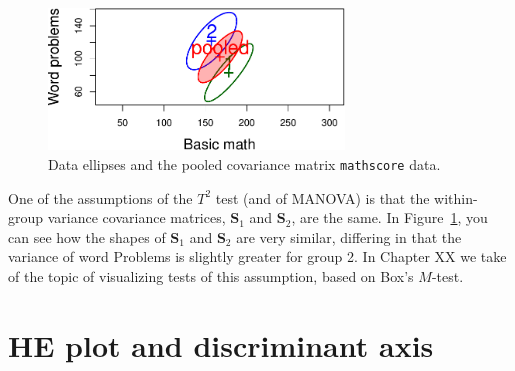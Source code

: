 \documentclass[
  letterpaper,
  10pt,
  krantz2]{krantz}
\makeatletter
\newenvironment{Shaded}{\begin{snugshade}}{\end{snugshade}}
\newcommand{\AttributeTok}[1]{\textcolor[rgb]{0.40,0.45,0.13}{#1}}
\newcommand{\ConstantTok}[1]{\textcolor[rgb]{0.56,0.35,0.01}{#1}}
\newcommand{\DecValTok}[1]{\textcolor[rgb]{0.68,0.00,0.00}{#1}}
\newcommand{\FloatTok}[1]{\textcolor[rgb]{0.68,0.00,0.00}{#1}}
\newcommand{\FunctionTok}[1]{\textcolor[rgb]{0.28,0.35,0.67}{#1}}
\newcommand{\NormalTok}[1]{\textcolor[rgb]{0.00,0.23,0.31}{#1}}
\newcommand{\SpecialCharTok}[1]{\textcolor[rgb]{0.37,0.37,0.37}{#1}}
\newcommand{\StringTok}[1]{\textcolor[rgb]{0.13,0.47,0.30}{#1}}
\newenvironment{kframe}{%
  \medskip{}
  \setlength{\fboxsep}{.8em}
  \def\at@end@of@kframe{}%
  \ifinner\ifhmode%
  \def\at@end@of@kframe{\end{minipage}}%
  \begin{minipage}{\columnwidth}%
  \fi\fi%
  \def\FrameCommand##1{\hskip\@totalleftmargin \hskip-\fboxsep
  \colorbox{shadecolor}{##1}\hskip-\fboxsep
      \hskip-\linewidth \hskip-\@totalleftmargin \hskip\columnwidth}%
  \MakeFramed {\advance\hsize-\width
    \@totalleftmargin\z@ \linewidth\hsize
    \@setminipage}}%
{\par\unskip\endMakeFramed%
  \at@end@of@kframe}
\renewenvironment{Shaded}{\begin{kframe}}{\end{kframe}}
\makeatother
\begin{document}
\begin{Shaded}
\end{Shaded}

\begin{figure}[H]

{\centering \includegraphics[width=0.7\textwidth,height=\textheight]{figs/fig-mathscore-cov2-1.pdf}

}

\caption{\label{fig-mathscore-cov2}Data ellipses and the pooled
covariance matrix \texttt{mathscore} data.}

\end{figure}

One of the assumptions of the \(T^2\) test (and of MANOVA) is that the
within-group variance covariance matrices, \(\mathbf{S}_1\) and
\(\mathbf{S}_2\), are the same. In Figure~\ref{fig-mathscore-cov2}, you
can see how the shapes of \(\mathbf{S}_1\) and \(\mathbf{S}_2\) are very
similar, differing in that the variance of word Problems is slightly
greater for group 2. In Chapter XX we take of the topic of visualizing
tests of this assumption, based on Box's \(M\)-test.

\hypertarget{he-plot-and-discriminant-axis}{%
\section{HE plot and discriminant
axis}\label{he-plot-and-discriminant-axis}}
\end{document}
